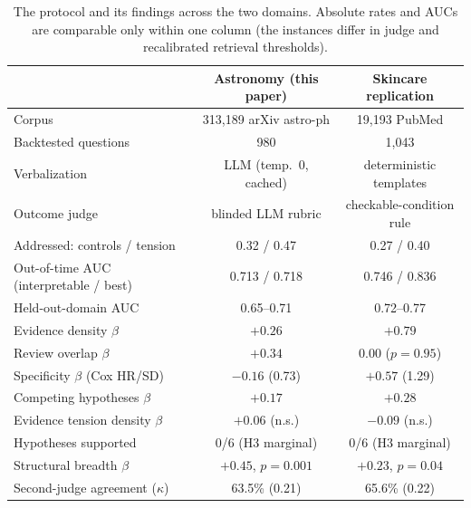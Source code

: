 \documentclass[11pt]{article}
\begin{document}
\begin{table}[htbp]
  \centering
  \caption{The protocol and its findings across the two domains.
  Absolute rates and AUCs are comparable only within one column (the
  instances differ in judge and recalibrated retrieval thresholds).}
  \label{tab:crossdomain}
  \footnotesize
  \setlength{\tabcolsep}{4pt}
  \begin{tabular}{lcc}
    \toprule
    & Astronomy (this paper) & Skincare replication \\
    \midrule
    Corpus & 313{,}189 arXiv astro-ph & 19{,}193 PubMed \\
    Backtested questions & 980 & 1{,}043 \\
    Verbalization & LLM (temp.\ 0, cached) & deterministic templates \\
    Outcome judge & blinded LLM rubric & checkable-condition rule \\
    Addressed: controls / tension & 0.32 / 0.47 & 0.27 / 0.40 \\
    Out-of-time AUC (interpretable / best) & 0.713 / 0.718 & 0.746 / 0.836 \\
    Held-out-domain AUC & 0.65--0.71 & 0.72--0.77 \\
    Evidence density $\beta$ & $+0.26$ & $+0.79$ \\
    Review overlap $\beta$ & $\mathbf{+0.34}$ & $0.00$ ($p=0.95$) \\
    Specificity $\beta$ (Cox HR/SD) & $-0.16$ (0.73) & $\mathbf{+0.57}$ (1.29) \\
    Competing hypotheses $\beta$ & $+0.17$ & $+0.28$ \\
    Evidence tension density $\beta$ & $+0.06$ (n.s.) & $-0.09$ (n.s.) \\
    Hypotheses supported & 0/6 (H3 marginal) & 0/6 (H3 marginal) \\
    Structural breadth $\beta$ & $+0.45$, $p=0.001$ & $+0.23$, $p=0.04$ \\
    Second-judge agreement ($\kappa$) & 63.5\% (0.21) & 65.6\% (0.22) \\
    \bottomrule
  \end{tabular}
\end{table}
\end{document}
